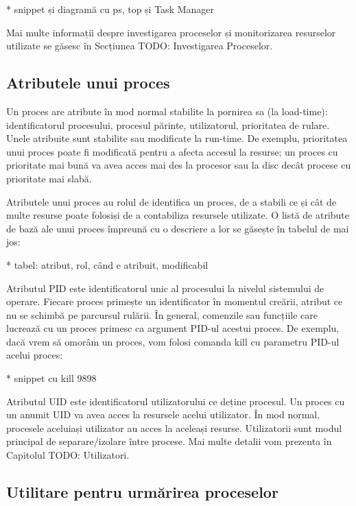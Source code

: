 * snippet și diagramă cu ps, top și Task Manager

Mai multe informații despre investigarea proceselor și monitorizarea resurselor
utilizate se găsesc în Secțiunea TODO: Investigarea Proceselor.

\subsection{Atributele unui proces}
\label{sec:procese-resurse-atribute}

Un proces are atribute în mod normal stabilite la pornirea sa (la load-time):
identificatorul procesului, procesul părinte, utilizatorul, prioritatea de
rulare. Unele atribuite sunt stabilite sau modificate la run-time. De exemplu,
prioritatea unui proces poate fi modificată pentru a afecta accesul la resurse;
un proces cu prioritate mai bună va avea acces mai des la procesor sau la disc
decât procese cu prioritate mai slabă.

Atributele unui proces au rolul de identifica un proces, de a stabili ce și cât
de multe resurse poate folosiși de a contabiliza resursele utilizate. O listă de
atribute de bază ale unui proces împreună cu o descriere a lor se găsește în
tabelul de mai jos:

* tabel: atribut, rol, când e atribuit, modificabil

Atributul PID este identificatorul unic al procesului la nivelul sistemului de
operare. Fiecare proces primește un identificator în momentul creării, atribut
ce nu se schimbă pe parcursul rulării. În general, comenzile sau funcțiile care
lucrează cu un proces primesc ca argument PID-ul acestui proces. De exemplu,
dacă vrem să omorâm un proces, vom folosi comanda kill cu parametru PID-ul
acelui proces:

* snippet cu kill 9898

Atributul UID este identificatorul utilizatorului ce deține procesul. Un proces
cu un anumit UID va avea acces la resursele acelui utilizator. În mod normal,
procesele aceluiași utilizator au acces la aceleași resurse. Utilizatorii sunt
modul principal de separare/izolare între procese. Mai multe detalii vom
prezenta în Capitolul TODO: Utilizatori.

\subsection{Utilitare pentru urmărirea proceselor}
\label{sec:procese-resurse-monitorizare}

